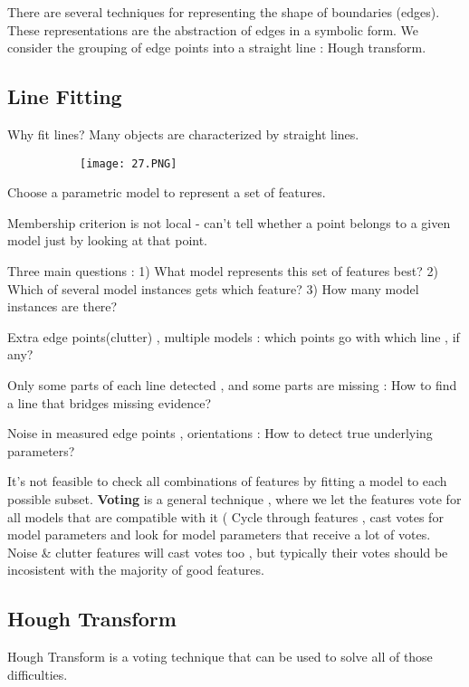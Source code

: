 \documentclass{article}
\begin{document}
There are several techniques for representing the shape of boundaries (edges).
These representations are the abstraction of edges in a symbolic form. 
We consider the grouping of edge points into a straight line : Hough transform.

\subsection{Line Fitting}

Why fit lines? Many objects are characterized by straight lines.

\begin{figure}[ht!]
  \centering
  \begin{subfigure}[b]{0.4\linewidth}
    \texttt{[image: 27.PNG]}
  \end{subfigure}
\end{figure}

Choose  a parametric model to represent a set of features.

Membership criterion is not local - can't tell whether a point belongs to a given model just by looking at that point.

Three main questions : 1) What model represents this set of features best? 2) Which of several model instances gets which feature? 3) How many model instances are there?

Extra edge points(clutter) , multiple models : which points go with which line , if any?

Only some parts of each line detected , and some parts are missing : How to find a line that bridges missing evidence?

Noise in measured edge points , orientations : How to detect true underlying parameters?

It's not feasible to check all combinations of features by fitting a model to each possible subset.
\textbf{Voting} is a general technique , where we let the features vote for all models that are compatible with it ( Cycle through features , cast votes for model parameters and look for model parameters that receive a lot of votes.
Noise \& clutter features will cast votes too , but typically their votes should be incosistent with the majority of good features.


\subsection{Hough Transform}

Hough Transform is a voting technique that can be used to solve all of those difficulties.
\end{document}
